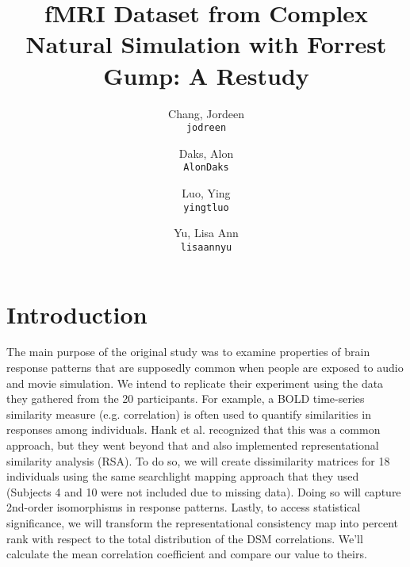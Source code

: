 \documentclass[11pt]{article}
\title{fMRI Dataset from Complex Natural Simulation with Forrest Gump: A Restudy}
\author{
  Chang, Jordeen\\
  \texttt{jodreen}
  \and
  Daks, Alon\\
  \texttt{AlonDaks}
  \and
  Luo, Ying\\
  \texttt{yingtluo}
  \and
  Yu, Lisa Ann\\
  \texttt{lisaannyu}
}
\begin{document}
\maketitle


\section{Introduction}

The main purpose of the original study was to examine properties of brain
response patterns that are supposedly common when people are exposed to audio
and movie simulation. We intend to replicate their experiment using the data
they gathered from the 20 participants. For example, a BOLD time-series
similarity measure (e.g. correlation) is often used to quantify similarities
in responses among individuals. Hank et al. recognized that this was a common
approach, but they went beyond that and also implemented representational
similarity analysis  (RSA). To do so, we will create dissimilarity matrices
for 18 individuals using the same searchlight mapping approach that they used
(Subjects 4 and 10 were not included due to missing data). Doing so will
capture 2nd-order isomorphisms in response patterns. Lastly, to access
statistical significance, we will transform the representational consistency
map into percent rank with respect to the total distribution of the DSM
correlations. We'll calculate the mean correlation coefficient and compare our
value to theirs.
\end{document}
